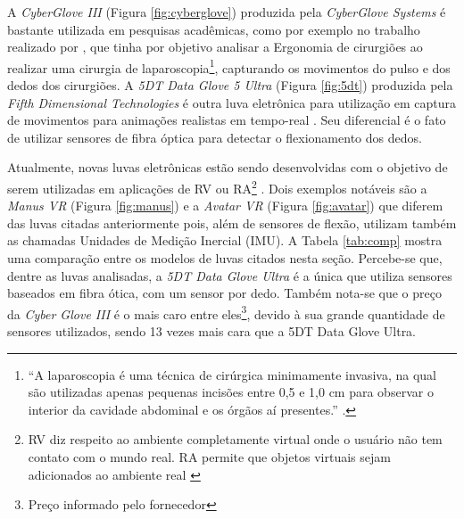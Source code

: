 A \textit{CyberGlove III} (Figura \ref{fig:cyberglove}) produzida pela \textit{CyberGlove Systems} é bastante utilizada em pesquisas acadêmicas, como por exemplo no trabalho realizado por , que tinha por objetivo analisar a Ergonomia de cirurgiões ao realizar uma cirurgia de laparoscopia\footnote{``A laparoscopia é uma técnica de cirúrgica minimamente invasiva, na qual são utilizadas apenas pequenas incisões entre 0,5 e 1,0 cm para observar o interior da cavidade abdominal e os órgãos aí presentes.'' \cite{laparos}.}, capturando os movimentos do pulso e dos dedos dos cirurgiões. A \textit{5DT Data Glove 5 Ultra} (Figura \ref{fig:5dt}) produzida pela \textit{Fifth Dimensional Technologies} é outra luva eletrônica para utilização em captura de movimentos para animações realistas em tempo-real \cite{5dt}. Seu diferencial é o fato de utilizar sensores de fibra óptica para detectar o flexionamento dos dedos.

Atualmente, novas luvas eletrônicas estão sendo desenvolvidas com o objetivo de serem utilizadas em aplicações de \ac{RV} ou \ac{RA}\footnote{\ac{RV} diz respeito ao ambiente completamente virtual onde o usuário não tem contato com o mundo real. \ac{RA} permite que objetos virtuais sejam adicionados ao ambiente real \cite{azuma1997survey}}
. Dois exemplos notáveis são a \textit{Manus VR} (Figura \ref{fig:manus}) e a \textit{Avatar VR} (Figura \ref{fig:avatar}) que diferem das luvas citadas anteriormente pois, além de sensores de flexão, utilizam também as chamadas Unidades de Medição Inercial (\acf{IMU}). A Tabela \ref{tab:comp} mostra uma comparação entre os modelos de luvas citados nesta seção. Percebe-se que, dentre as luvas analisadas, a \textit{5DT Data Glove Ultra} é a única que utiliza sensores baseados em fibra ótica, com um sensor por dedo. Também nota-se que o preço da \textit{Cyber Glove III} é o mais caro entre eles\footnote{Preço informado pelo fornecedor}, devido à sua grande quantidade de sensores utilizados, sendo 13 vezes mais cara que a 5DT Data Glove Ultra.

